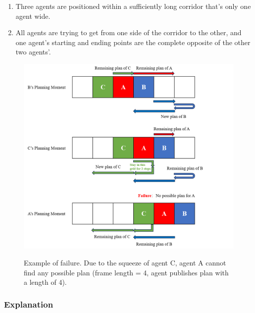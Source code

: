 \begin{enumerate}
    \item Three agents are positioned within a sufficiently long corridor that's only one agent wide.
    \item All agents are trying to get from one side of the corridor to the other, and one agent's starting and ending points are the complete opposite of the other two agents'.
\end{enumerate}

\begin{figure}[htbp]
    \centering
    \includegraphics[width = \linewidth]{figures/Failure.png}
    \label{fig:failure}
    \caption{Example of failure. Due to the squeeze of agent C, agent A cannot find any possible plan (frame length = 4, agent publishes plan with a length of 4).}
\end{figure}

\subsubsection{Explanation}

